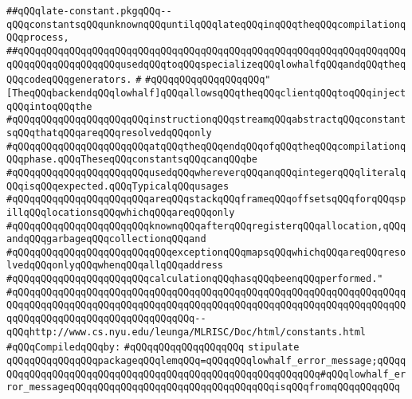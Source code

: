 \label{src/lib/compiler/back/low/main/nextcode/late-constant.pkg}
\verb|##qQQqlate-constant.pkgqQQq--qQQqconstantsqQQqunknownqQQquntilqQQqlateqQQqinqQQqtheqQQqcompilationqQQqprocess,|\newline
\verb|##qQQqqQQqqQQqqQQqqQQqqQQqqQQqqQQqqQQqqQQqqQQqqQQqqQQqqQQqqQQqqQQqqQQqqQQqqQQqqQQqqQQqqQQqusedqQQqtoqQQqspecializeqQQqlowhalfqQQqandqQQqtheqQQqcodeqQQqgenerators.|\newline
\verb|#|\newline
\verb|#qQQqqQQqqQQqqQQqqQQq"[TheqQQqbackendqQQqlowhalf]qQQqallowsqQQqtheqQQqclientqQQqtoqQQqinjectqQQqintoqQQqthe|\newline
\verb|#qQQqqQQqqQQqqQQqqQQqqQQqinstructionqQQqstreamqQQqabstractqQQqconstantsqQQqthatqQQqareqQQqresolvedqQQqonly|\newline
\verb|#qQQqqQQqqQQqqQQqqQQqqQQqatqQQqtheqQQqendqQQqofqQQqtheqQQqcompilationqQQqphase.qQQqTheseqQQqconstantsqQQqcanqQQqbe|\newline
\verb|#qQQqqQQqqQQqqQQqqQQqqQQqusedqQQqwhereverqQQqanqQQqintegerqQQqliteralqQQqisqQQqexpected.qQQqTypicalqQQqusages|\newline
\verb|#qQQqqQQqqQQqqQQqqQQqqQQqareqQQqstackqQQqframeqQQqoffsetsqQQqforqQQqspillqQQqlocationsqQQqwhichqQQqareqQQqonly|\newline
\verb|#qQQqqQQqqQQqqQQqqQQqqQQqknownqQQqafterqQQqregisterqQQqallocation,qQQqandqQQqgarbageqQQqcollectionqQQqand|\newline
\verb|#qQQqqQQqqQQqqQQqqQQqqQQqqQQqexceptionqQQqmapsqQQqwhichqQQqareqQQqresolvedqQQqonlyqQQqwhenqQQqallqQQqaddress|\newline
\verb|#qQQqqQQqqQQqqQQqqQQqqQQqcalculationqQQqhasqQQqbeenqQQqperformed."|\newline
\verb|#qQQqqQQqqQQqqQQqqQQqqQQqqQQqqQQqqQQqqQQqqQQqqQQqqQQqqQQqqQQqqQQqqQQqqQQqqQQqqQQqqQQqqQQqqQQqqQQqqQQqqQQqqQQqqQQqqQQqqQQqqQQqqQQqqQQqqQQqqQQqqQQqqQQqqQQqqQQqqQQqqQQqqQQqqQQq--qQQqhttp://www.cs.nyu.edu/leunga/MLRISC/Doc/html/constants.html|\newline
\newline
\verb|#qQQqCompiledqQQqby:|\newline
\verb|#qQQqqQQqqQQqqQQqqQQq|\newline
\newline
\verb|stipulate|\newline
\verb|qQQqqQQqqQQqqQQqpackageqQQqlemqQQq=qQQqqQQqlowhalf_error_message;qQQqqQQqqQQqqQQqqQQqqQQqqQQqqQQqqQQqqQQqqQQqqQQqqQQqqQQqqQQq#qQQqlowhalf_error_messageqQQqqQQqqQQqqQQqqQQqqQQqqQQqqQQqqQQqisqQQqfromqQQqqQQqqQQq|\newline
